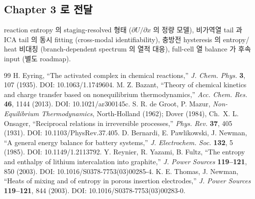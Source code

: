 \documentclass[11pt,a4paper]{article}
\begin{document}
\subsection{Chapter 3 로 전달}
reaction entropy 의 staging-resolved 형태 ($\partial U/\partial x$ 의 정량 모델), 비가역열
tail 과 ICA tail 의 동시 fitting (cross-modal identifiability), 충방전 hysteresis 의 entropy/
heat 비대칭 (branch-dependent spectrum 의 열적 대응), full-cell 열 balance 가 후속 input
(별도 roadmap).

\begin{thebibliography}{99}
 H. Eyring, ``The activated complex in chemical reactions,''
  \emph{J. Chem. Phys.} \textbf{3}, 107 (1935). DOI: 10.1063/1.1749604.
 M. Z. Bazant, ``Theory of chemical kinetics and charge transfer
  based on nonequilibrium thermodynamics,'' \emph{Acc. Chem. Res.} \textbf{46}, 1144
  (2013). DOI: 10.1021/ar300145c.
 S. R. de Groot, P. Mazur, \emph{Non-Equilibrium
  Thermodynamics}, North-Holland (1962); Dover (1984), Ch.~X.
 L. Onsager, ``Reciprocal relations in irreversible processes,''
  \emph{Phys. Rev.} \textbf{37}, 405 (1931). DOI: 10.1103/PhysRev.37.405.
 D. Bernardi, E. Pawlikowski, J. Newman, ``A general energy balance
  for battery systems,'' \emph{J. Electrochem. Soc.} \textbf{132}, 5 (1985). DOI:
  10.1149/1.2113792.
 Y. Reynier, R. Yazami, B. Fultz, ``The entropy and enthalpy of
  lithium intercalation into graphite,'' \emph{J. Power Sources} \textbf{119--121}, 850
  (2003). DOI: 10.1016/S0378-7753(03)00285-4.
 K. E. Thomas, J. Newman, ``Heats of mixing and of entropy in
  porous insertion electrodes,'' \emph{J. Power Sources} \textbf{119--121}, 844 (2003).
  DOI: 10.1016/S0378-7753(03)00283-0.
\end{thebibliography}
\end{document}
